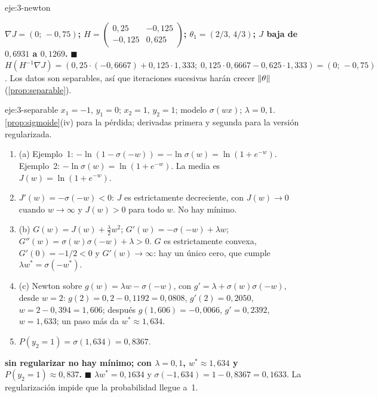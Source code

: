 \begin{solucion}{eje:3-newton}
\begin{enumerate}[label=\arabic*.]
\end{enumerate}
\resultado \textbf{$\nabla J=(0;\,-0{,}75)$; $H=\begin{pmatrix}0{,}25&-0{,}125\\-0{,}125&0{,}625\end{pmatrix}$; $\theta_1=(2/3,\,4/3)$; $J$ baja de $0{,}6931$ a $0{,}1269$.} $\blacksquare$
\comprobacion $H(H^{-1}\nabla J)=(0{,}25\cdot(-0{,}6667)+0{,}125\cdot 1{,}333;\;0{,}125\cdot 0{,}6667-0{,}625\cdot 1{,}333)=(0;\,-0{,}75)$. Los datos son separables, así que iteraciones sucesivas harán crecer $\lVert\theta\rVert$ (\cref{prop:separable}).
\end{solucion}

\begin{solucion}{eje:3-separable}
\datos $x_1=-1$, $y_1=0$; $x_2=1$, $y_2=1$; modelo $\sigma(wx)$; $\lambda=0{,}1$.
\planteamiento \cref{prop:sigmoide}(iv) para la pérdida; derivadas primera y segunda para la versión regularizada.
\pasos
\begin{enumerate}[label=\arabic*.]
  \item (a) Ejemplo~1: $-\ln(1-\sigma(-w))=-\ln\sigma(w)=\ln(1+e^{-w})$. Ejemplo~2: $-\ln\sigma(w)=\ln(1+e^{-w})$. La media es $J(w)=\ln(1+e^{-w})$.
  \item $J'(w)=-\sigma(-w)<0$: $J$ es estrictamente decreciente, con $J(w)\to 0$ cuando $w\to\infty$ y $J(w)>0$ para todo $w$. No hay mínimo.
  \item (b) $G(w)=J(w)+\frac{\lambda}{2}w^{2}$; $G'(w)=-\sigma(-w)+\lambda w$; $G''(w)=\sigma(w)\sigma(-w)+\lambda>0$. $G$ es estrictamente convexa, $G'(0)=-1/2<0$ y $G'(w)\to\infty$: hay un único cero, que cumple $\lambda w^{*}=\sigma(-w^{*})$.
  \item (c) Newton sobre $g(w)=\lambda w-\sigma(-w)$, con $g'=\lambda+\sigma(w)\sigma(-w)$, desde $w=2$: $g(2)=0{,}2-0{,}1192=0{,}0808$, $g'(2)=0{,}2050$, $w=2-0{,}394=1{,}606$; después $g(1{,}606)=-0{,}0066$, $g'=0{,}2392$, $w=1{,}633$; un paso más da $w^{*}\approx 1{,}634$.
  \item $P(y_2=1)=\sigma(1{,}634)=0{,}8367$.
\end{enumerate}
\resultado \textbf{sin regularizar no hay mínimo; con $\lambda=0{,}1$, $w^{*}\approx 1{,}634$ y $P(y_2=1)\approx 0{,}837$.} $\blacksquare$
\comprobacion $\lambda w^{*}=0{,}1634$ y $\sigma(-1{,}634)=1-0{,}8367=0{,}1633$. La regularización impide que la probabilidad llegue a~1.
\end{solucion}

